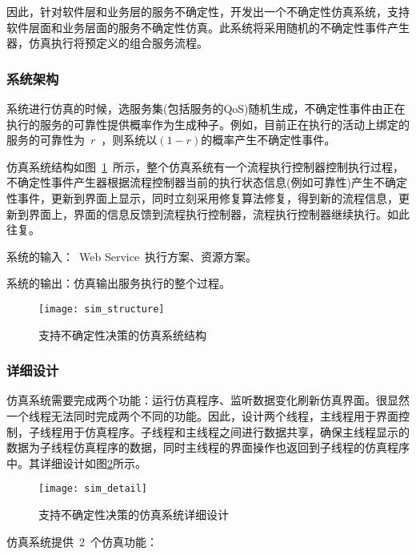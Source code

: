 因此，针对软件层和业务层的服务不确定性，开发出一个不确定性仿真系统，支持软件层面和业务层面的服务不确定性仿真。此系统将采用随机的不确定性事件产生器，仿真执行将预定义的组合服务流程。

\subsubsection{系统架构}

系统进行仿真的时候，选服务集(包括服务的QoS)随机生成，不确定性事件由正在执行的服务的可靠性提供概率作为生成种子。例如，目前正在执行的活动上绑定的服务的可靠性为~$r$~，则系统以$(1-r)$的概率产生不确定性事件。

仿真系统结构如图~\ref{figure:sim_structure}~所示，整个仿真系统有一个流程执行控制器控制执行过程，不确定性事件产生器根据流程控制器当前的执行状态信息(例如可靠性)产生不确定性事件，更新到界面上显示，同时立刻采用修复算法修复，得到新的流程信息，更新到界面上，界面的信息反馈到流程执行控制器，流程执行控制器继续执行。如此往复。

系统的输入：~Web Service~执行方案、资源方案。

系统的输出：仿真输出服务执行的整个过程。

\begin{figure}[htbp]
    \centering
    \texttt{[image: sim\_structure]}
    \caption{支持不确定性决策的仿真系统结构}\label{figure:sim_structure}
    \vspace{-1em}
\end{figure}

\subsubsection{详细设计}

仿真系统需要完成两个功能：运行仿真程序、监听数据变化刷新仿真界面。很显然一个线程无法同时完成两个不同的功能。因此，设计两个线程，主线程用于界面控制，子线程用于仿真程序。子线程和主线程之间进行数据共享，确保主线程显示的数据为子线程仿真程序的数据，同时主线程的界面操作也返回到子线程的仿真程序中。其详细设计如图\ref{figure:sim_detail}所示。

\begin{figure}[htbp]
    \centering
    \texttt{[image: sim\_detail]}
    \caption{支持不确定性决策的仿真系统详细设计}\label{figure:sim_detail}
    \vspace{-1em}
\end{figure}

仿真系统提供~2~个仿真功能：

